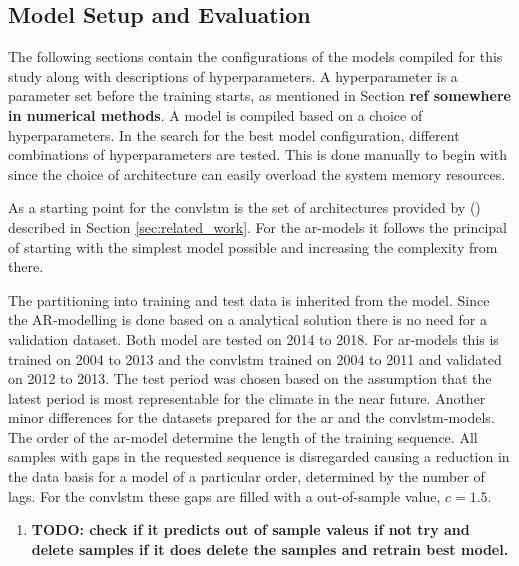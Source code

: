 \subsection{Model Setup and Evaluation}
The following sections contain the configurations of the models compiled for this study along with descriptions of hyperparameters. A hyperparameter is a parameter set before the training starts, as mentioned in Section \textbf{ref somewhere in numerical methods}. A model is compiled based on a choice of hyperparameters. In the search for the best model configuration, different combinations of hyperparameters are tested. This is done manually to begin with since the choice of architecture can easily overload the system memory resources.
 
As a starting point for the \acrshort{convlstm} is the set of architectures provided by \citeauthor{SunAirLSTM} (\citeyear{SunAirLSTM}) described in Section \ref{sec:related_work}. For the \acrshort{ar}-models it follows the principal of starting with the simplest model possible and increasing the complexity from there. 

The partitioning into training and test data is inherited from the model. Since the AR-modelling is done based on a analytical solution there is no need for a validation dataset. Both model are tested on 2014 to 2018. For \acrshort{ar}-models this is trained on 2004 to 2013 and the \acrshort{convlstm} trained on  2004 to 2011 and validated on  2012 to 2013. The test period was chosen based on the assumption that the latest period is most representable for the climate in the near future. Another minor differences for the datasets prepared for the \acrshort{ar} and the \acrshort{convlstm}-models. The order of the \acrshort{ar}-model determine the length of the training sequence. All samples with gaps in the requested sequence is disregarded causing a reduction in the data basis for a model of a particular order, determined by the number of lags. For the \acrshort{convlstm} these gaps are filled with a out-of-sample value, $c=1.5$. 
\begin{enumerate}
    \item \textbf{TODO: check if it predicts out of sample valeus if not try and delete samples if it does delete the samples and retrain best model.}
\end{enumerate}

